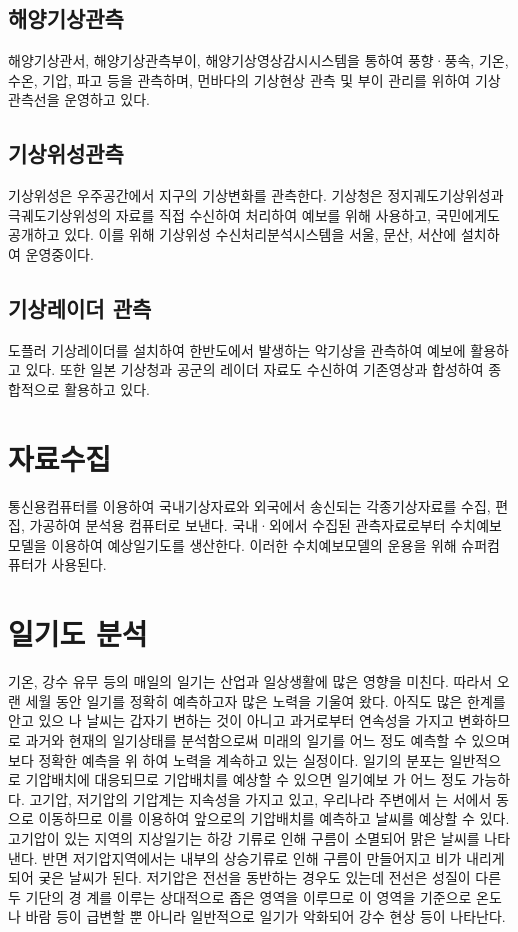 \subsection{해양기상관측}
해양기상관서, 해양기상관측부이, 해양기상영상감시시스템을 통하여 풍향·풍속, 기온, 수온, 기압, 파고 등을 관측하며, 먼바다의 기상현상 관측 및 부이 관리를 위하여 기상관측선을 운영하고 있다.

\subsection{기상위성관측}
기상위성은 우주공간에서 지구의 기상변화를 관측한다. 기상청은 정지궤도기상위성과 극궤도기상위성의 자료를 직접 수신하여 처리하여 예보를 위해 사용하고, 국민에게도 공개하고 있다. 이를 위해 기상위성 수신처리분석시스템을 서울, 문산, 서산에 설치하여 운영중이다.

\subsection{기상레이더 관측}
도플러 기상레이더를 설치하여 한반도에서 발생하는 악기상을 관측하여 예보에 활용하고 있다. 또한 일본 기상청과 공군의 레이더 자료도 수신하여 기존영상과 합성하여 종합적으로 활용하고 있다.


\section{자료수집}
통신용컴퓨터를 이용하여 국내기상자료와 외국에서 송신되는 각종기상자료를 수집, 편집, 가공하여 분석용 컴퓨터로 보낸다. 국내·외에서 수집된 관측자료로부터 수치예보모델을 이용하여 예상일기도를 생산한다. 이러한 수치예보모델의 운용을 위해 슈퍼컴퓨터가 사용된다.

\section{일기도 분석}
	
	기온, 강수 유무 등의 매일의 일기는 산업과 일상생활에 많은 영향을 미친다. 따라서 오랜
	세월 동안 일기를 정확히 예측하고자 많은 노력을 기울여 왔다. 아직도 많은 한계를 안고 있으
	나 날씨는 갑자기 변하는 것이 아니고 과거로부터 연속성을 가지고 변화하므로 과거와 현재의
	일기상태를 분석함으로써 미래의 일기를 어느 정도 예측할 수 있으며 보다 정확한 예측을 위
	하여 노력을 계속하고 있는 실정이다.
	일기의 분포는 일반적으로 기압배치에 대응되므로 기압배치를 예상할 수 있으면 일기예보
	가 어느 정도 가능하다. 고기압, 저기압의 기압계는 지속성을 가지고 있고, 우리나라 주변에서
	는 서에서 동으로 이동하므로 이를 이용하여 앞으로의 기압배치를 예측하고 날씨를 예상할 수
	있다. 고기압이 있는 지역의 지상일기는 하강 기류로 인해 구름이 소멸되어 맑은 날씨를 나타
	낸다. 반면 저기압지역에서는 내부의 상승기류로 인해 구름이 만들어지고 비가 내리게 되어
	궂은 날씨가 된다. 저기압은 전선을 동반하는 경우도 있는데 전선은 성질이 다른 두 기단의 경
	계를 이루는 상대적으로 좁은 영역을 이루므로 이 영역을 기준으로 온도나 바람 등이 급변할
	뿐 아니라 일반적으로 일기가 악화되어 강수 현상 등이 나타난다.
	
